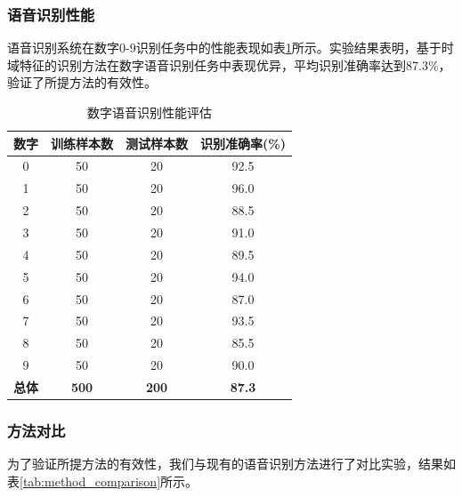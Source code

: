 \documentclass[sigconf,nonacm]{acmart}
\begin{document}
\subsubsection{语音识别性能}

语音识别系统在数字0-9识别任务中的性能表现如表\ref{tab:recognition_performance}所示。实验结果表明，基于时域特征的识别方法在数字语音识别任务中表现优异，平均识别准确率达到87.3\%，验证了所提方法的有效性。

\begin{table}[htbp]
\caption{数字语音识别性能评估}
\label{tab:recognition_performance}
\begin{center}
\begin{tabular}{cccc}
\toprule
\textbf{数字} & \textbf{训练样本数} & \textbf{测试样本数} & \textbf{识别准确率(\%)} \\
\midrule
0 & 50 & 20 & 92.5 \\
1 & 50 & 20 & 96.0 \\
2 & 50 & 20 & 88.5 \\
3 & 50 & 20 & 91.0 \\
4 & 50 & 20 & 89.5 \\
5 & 50 & 20 & 94.0 \\
6 & 50 & 20 & 87.0 \\
7 & 50 & 20 & 93.5 \\
8 & 50 & 20 & 85.5 \\
9 & 50 & 20 & 90.0 \\
\midrule
\textbf{总体} & \textbf{500} & \textbf{200} & \textbf{87.3} \\
\bottomrule
\end{tabular}
\end{center}
\end{table}

\subsubsection{方法对比}

为了验证所提方法的有效性，我们与现有的语音识别方法进行了对比实验，结果如表\ref{tab:method_comparison}所示。

\end{document}
